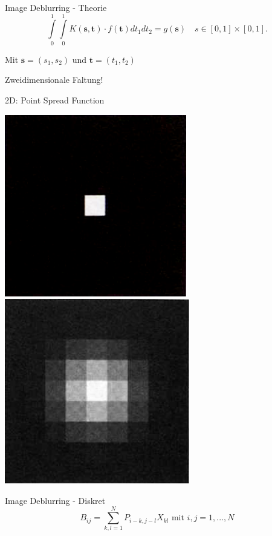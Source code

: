 \documentclass[11pt]{beamer}
\begin{document}
\begin{frame}{Image Deblurring - Theorie}
\[
\int\limits_0^1
  \int\limits_0^1
    K(\textbf{s},\textbf{t}) \cdot f(\textbf{t}) dt_1 dt_2
= g(\textbf{s})
\,\,\,\,\,\,
s \in [0,1] \times [0,1].
\]

Mit $\textbf{s} = (s_1,s_2)$ und $\textbf{t} = (t_1,t_2)$
\linebreak

Zweidimensionale Faltung!
\end{frame}


\begin{frame}{2D: Point Spread Function}
\begin{center}
\includegraphics[scale=0.5]{psf_pre}
\mbox{}
\mbox{}
\includegraphics[scale=0.491]{psf_post}
\end{center}
\end{frame}



\begin{frame}{Image Deblurring - Diskret}
\[
B_{ij} = \sum\limits_{k, l = 1}^N P_{i-k,j-l} X_{kl}
\mbox{ mit } i, j = 1, ..., N
\]
\end{frame}
\end{document}

